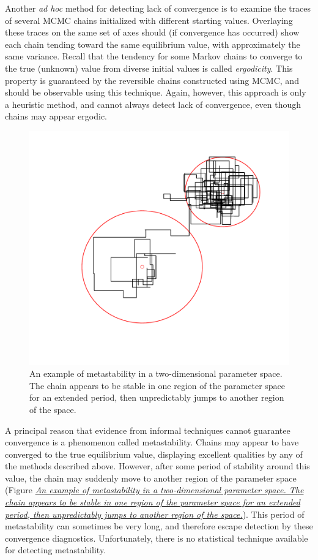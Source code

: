 \documentclass[letterpaper,10pt,english]{sphinxmanual}
\begin{document}
Another \emph{ad hoc} method for detecting lack of convergence is to examine the traces of several MCMC chains initialized with different starting values. Overlaying these traces on the same set of axes should (if convergence has occurred) show each chain tending toward the same equilibrium value, with approximately the same variance. Recall that the tendency for some Markov chains to converge to the true (unknown) value from diverse initial values is called \emph{ergodicity}. This property is guaranteed by the reversible chains constructed using MCMC, and should be observable using this technique. Again, however, this approach is only a heuristic method, and cannot always detect lack of convergence, even though chains may appear ergodic.
\begin{figure}[htbp]
\centering
\capstart

\includegraphics{metastable.pdf}
\caption{An example of metastability in a two-dimensional parameter space. The
chain appears to be stable in one region of the parameter space for an
extended period, then unpredictably jumps to another region of the
space.}\label{modelchecking:metas}\end{figure}

A principal reason that evidence from informal techniques cannot guarantee convergence is a phenomenon called metastability. Chains may appear to have converged to the true equilibrium value, displaying excellent qualities by any of the methods described above. However, after some period of stability around this value, the chain may suddenly move to another region of the parameter space (Figure {\hyperref[modelchecking:metas]{\emph{An example of metastability in a two-dimensional parameter space. The
chain appears to be stable in one region of the parameter space for an
extended period, then unpredictably jumps to another region of the
space.}}}). This period of metastability can sometimes be very long, and therefore escape detection by these convergence diagnostics. Unfortunately, there is no statistical technique available for detecting metastability.
\end{document}
